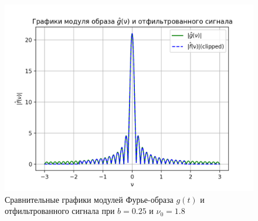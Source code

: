 \begin{figure}[ht!]
    \centering
    \includegraphics[scale=0.55]{media/1 task/high_freq/Fourier_Image_Comparison_0,25_-1,7987987987987988.png}
    \caption{Сравнительные графики модулей Фурье-образа $g(t)$ и отфильтрованного сигнала при $b=0.25$ и $\nu_0=1.8$}
    \label{fig:fourc_025_18}
\end{figure}